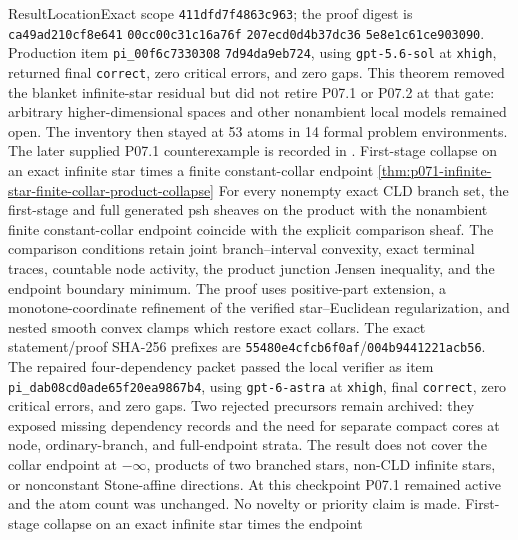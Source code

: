 \begin{AppLProvenanceLedger}{Result}{Location}{Exact scope}
{   \texttt{411dfd7f4863c963}; the proof digest is
   \texttt{ca49ad210cf8e641}\hspace{0pt}
   \texttt{00cc00c31c16a76f}\hspace{0pt}
   \texttt{207ecd0d4b37dc36}\hspace{0pt}
   \texttt{5e8e1c61ce903090}.  Production item
   \texttt{pi\_00f6c7330308}\hspace{0pt}
   \texttt{7d94da9eb724}, using
   \texttt{gpt-5.6-sol} at \texttt{xhigh}, returned final
   \texttt{correct}, zero critical errors, and zero gaps.  This theorem
   removed the blanket infinite-star residual but did not retire P07.1 or
   P07.2 at that gate: arbitrary higher-dimensional spaces and other nonambient
   local models remained open. The inventory then stayed at 53 atoms in 14
   formal problem environments. The later supplied P07.1 counterexample is
   recorded in .}
\AppLProvenanceRecord
  {First-stage collapse on an exact infinite star times a finite
   constant-collar endpoint}
  {\cref{thm:p071-infinite-star-finite-collar-product-collapse}}
  {For every nonempty exact CLD branch set, the first-stage and full
   generated psh sheaves on the product with the nonambient finite
   constant-collar endpoint coincide with the explicit comparison sheaf.
   The comparison conditions retain joint branch--interval convexity,
   exact terminal traces, countable node activity, the product junction
   Jensen inequality, and the endpoint boundary minimum.  The proof uses
   positive-part extension, a monotone-coordinate refinement of the
   verified star--Euclidean regularization, and nested smooth convex clamps
   which restore exact collars.  The exact statement/proof SHA-256 prefixes
   are \texttt{55480e4cfcb6f0af}/\texttt{004b9441221acb56}.  The repaired
   four-dependency packet passed the local verifier as item
   \nolinkurl{pi_dab08cd0ade65f20ea9867b4}, using
   \texttt{gpt-6-astra} at \texttt{xhigh}, final \texttt{correct}, zero
   critical errors, and zero gaps.  Two rejected precursors remain archived:
   they exposed missing dependency records and the need for separate compact
   cores at node, ordinary-branch, and full-endpoint strata.  The result does
   not cover the collar endpoint at \(-\infty\), products of two branched
   stars, non-CLD infinite stars, or nonconstant Stone-affine directions.
   At this checkpoint P07.1 remained active and the atom count was unchanged.
   No novelty or priority claim is made.}
\AppLProvenanceRecord
  {First-stage collapse on an exact infinite star times the endpoint
}
\end{AppLProvenanceLedger}
